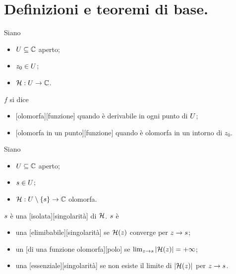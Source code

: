 \section{Definizioni e teoremi di base.}
\label{AnalisiComplessa_DefinizioniETeoremiDiBase}
\begin{Definition}
  Siano
  \begin{itemize}
    \item $U \subseteq \mathbb{C}$ aperto;
    \item $z_0 \in U$;
    \item $\mathcal{H}: U \rightarrow \mathbb{C}$.
  \end{itemize}
  $f$ si dice
  \begin{itemize}
    \item {}[olomorfa][funzione]
      quando \`e derivabile in ogni punto di $U$;
    \item {}[olomorfa in un punto][funzione]
      quando \`e olomorfa in un intorno di $z_0$.
  \end{itemize}
\end{Definition}
\begin{Definition}
  Siano
  \begin{itemize}
    \item $U \subseteq \mathbb{C}$ aperto;
    \item $s \in U$;
    \item $\mathcal{H}: U \setminus \lbrace s \rbrace
            \rightarrow \mathbb{C}$ olomorfa.
  \end{itemize}
  $s$ \`e una
  [isolata][singolarit\`a]
  di $\mathcal{H}$.
  $s$ \`e
  \begin{itemize}
    \item una [elimibabile][singolarit\`a] se
      $\mathcal{H}(z)$ converge per $z \rightarrow s$;
    \item un [di una funzione olomorfa][polo]
      se
      $\lim_{z \rightarrow s}
        \left \lvert \mathcal{H}(z) \right \rvert = + \infty$;
    \item una [essenziale][singolarit\`a]
      se non esiste il limite di $\left \lvert \mathcal{H}(z) \right \rvert$ per
      $z \rightarrow s$.
  \end{itemize}
\end{Definition}
